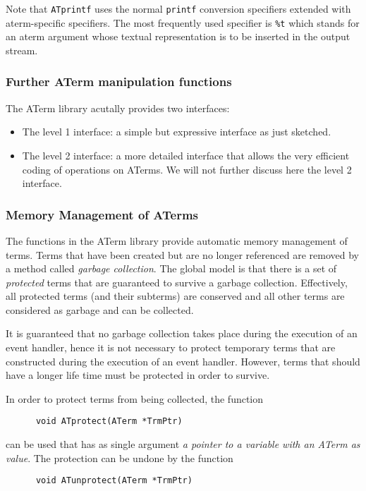 \documentclass[a4,twoside,noweb]{article} %
\begin{document}
Note that {\tt ATprintf} uses the normal {\tt printf} conversion
specifiers extended with aterm-specific specifiers. The most
frequently used specifier is {\tt \%t} which stands for an aterm
argument whose textual representation is to be inserted in the output
stream.


\subsubsection{\label{ATermManipulation}Further ATerm manipulation functions}

The ATerm library acutally provides two interfaces:

\begin{itemize}

\item The level 1 interface: a simple but expressive interface as just sketched.

\item The level 2 interface: a more detailed interface that allows the
very efficient coding of operations on ATerms. We will not further
discuss here the level 2 interface.

\end{itemize}

\subsubsection{\label{Memory}Memory Management of ATerms}
The functions in the ATerm library provide automatic memory management
of terms.  Terms that have been created but are no longer referenced
are removed by a method called {\em garbage collection}.  The global
model is that there is a set of {\em protected} terms that are
guaranteed to survive a garbage collection.  Effectively, all
protected terms (and their subterms) are conserved and all other terms
are considered as garbage and can be collected.

It is guaranteed that no garbage collection takes place during
the execution of an event handler, hence it is not necessary to
protect temporary terms that are constructed during the execution
of an event handler.
However, terms that should have a longer life time must be protected
in order to survive.

In order to protect terms from being collected, the function
\begin{verbatim}
      void ATprotect(ATerm *TrmPtr)
\end{verbatim}
can be used that has as single argument {\em a pointer to a variable
with an ATerm  as value}. The protection can be undone
by the function
\begin{verbatim}
      void ATunprotect(ATerm *TrmPtr)
\end{verbatim}
\end{document}
